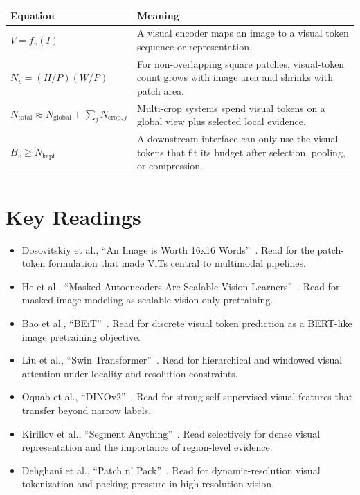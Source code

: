 \begin{center}
\begin{tabularx}{\textwidth}{@{}lX@{}}
\toprule
\textbf{Equation} & \textbf{Meaning} \\
\midrule
$V = f_v(I)$ & A visual encoder maps an image to a visual token sequence or representation. \\
$N_v = (H/P)(W/P)$ & For non-overlapping square patches, visual-token count grows with image area and shrinks with patch area. \\
$N_{\mathrm{total}} \approx N_{\mathrm{global}} + \sum_j N_{\mathrm{crop},j}$ & Multi-crop systems spend visual tokens on a global view plus selected local evidence. \\
$B_v \geq N_{\mathrm{kept}}$ & A downstream interface can only use the visual tokens that fit its budget after selection, pooling, or compression. \\
\bottomrule
\end{tabularx}
\end{center}

\section*{Key Readings}

\begin{itemize}[leftmargin=1.5em]
  \item Dosovitskiy et al., ``An Image is Worth 16x16 Words''~\cite{dosovitskiy2020image}. Read for the patch-token formulation that made ViTs central to multimodal pipelines.
  \item He et al., ``Masked Autoencoders Are Scalable Vision Learners''~\cite{he2022masked}. Read for masked image modeling as scalable vision-only pretraining.
  \item Bao et al., ``BEiT''~\cite{bao2021beit}. Read for discrete visual token prediction as a BERT-like image pretraining objective.
  \item Liu et al., ``Swin Transformer''~\cite{liu2021swin}. Read for hierarchical and windowed visual attention under locality and resolution constraints.
  \item Oquab et al., ``DINOv2''~\cite{oquab2023dinov2}. Read for strong self-supervised visual features that transfer beyond narrow labels.
  \item Kirillov et al., ``Segment Anything''~\cite{kirillov2023segment}. Read selectively for dense visual representation and the importance of region-level evidence.
  \item Dehghani et al., ``Patch n' Pack''~\cite{dehghani2023patch}. Read for dynamic-resolution visual tokenization and packing pressure in high-resolution vision.
\end{itemize}

\flushbottom
